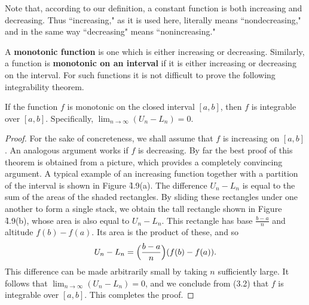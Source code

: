 Note that, according to our definition, a constant function is both increasing and decreasing. Thus ``increasing," as it is used here, literally means ``nondecreasing," and in the same way ``decreasing" means ``nonincreasing."

A \textbf{monotonic function} is one which is either increasing or decreasing. Similarly, a function is \textbf{monotonic on an interval} if it is either increasing or decreasing on the interval. For such functions it is not difficult to prove the following integrability theorem.

\begin{theorem} %
If the function $f$ is monotonic on the closed interval $[a, b]$, then $f$ is integrable over $[a, b]$. Specifically, $\lim_{n \rightarrow \infty} (U_n - L_n) = 0$.
\end{theorem}

\begin{proof}
For the sake of concreteness, we shall assume that $f$ is increasing on $[a, b]$. An analogous argument works if $f$ is decreasing. By far the best proof of this theorem is obtained from a picture, which provides a completely convincing argument. A typical example of an increasing function together with a partition of the interval is shown in Figure \f{4.9}(a). The difference $U_n - L_n$ is equal to the sum of the areas of the shaded rectangles. By sliding these rectangles under one another to form a single stack, we obtain the tall rectangle shown in Figure \f{4.9}(b), whose area is also equal to $U_n - L_n$. 
This rectangle has base $\frac{b-a}{n}$ and altitude $f(b) - f(a)$. Its area is the product of these, and so
$$
U_n - L_n = \Bigl( \frac{b - a}{n} \Bigr) (f(b) - f(a)).
$$
This difference can be made arbitrarily small by taking $n$ sufficiently large. It follows that $\lim_{n \rightarrow \infty} (U_n - L_n) = 0$, and we conclude from (3.2) that $f$ is integrable over $[a, b]$. This completes the proof.
\end{proof}


